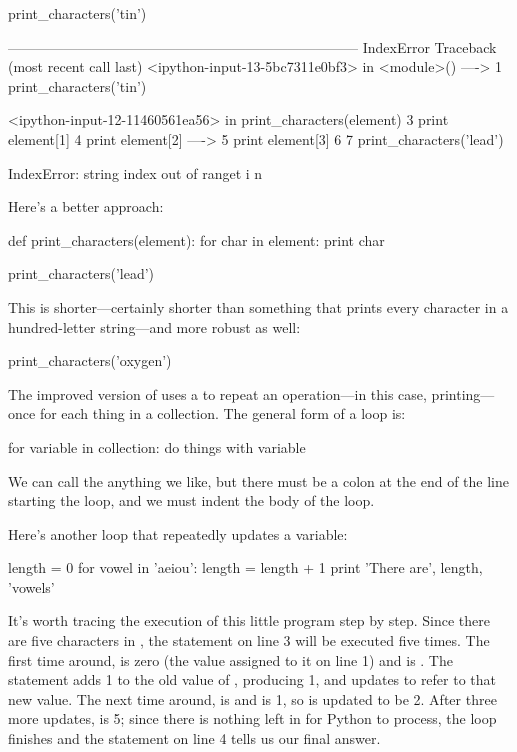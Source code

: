 \begin{VerbIn}
print_characters('tin')
\end{VerbIn}

\begin{VerbErr}
---------------------------------------------------------------------------
IndexError                                Traceback (most recent call last)
<ipython-input-13-5bc7311e0bf3> in <module>()
----> 1 print_characters('tin')

<ipython-input-12-11460561ea56> in print_characters(element)
      3     print element[1]
      4     print element[2]
----> 5     print element[3]
      6
      7 print_characters('lead')

IndexError: string index out of ranget
i
n
\end{VerbErr}

Here's a better approach:

\begin{VerbIn}
def print_characters(element):
    for char in element:
        print char

print_characters('lead')
\end{VerbIn}

This is shorter---certainly shorter than something that prints every
character in a hundred-letter string---and more robust as well:

\begin{VerbIn}
print_characters('oxygen')
\end{VerbIn}

The improved version of  uses a
 to repeat an operation---in this case,
printing---once for each thing in a collection. The general form of a
loop is:

\begin{VerbIn}
for variable in collection:
    do things with variable
\end{VerbIn}

We can call the  anything we
like, but there must be a colon at the end of the line starting the
loop, and we must indent the body of the loop.

Here's another loop that repeatedly updates a variable:

\begin{VerbIn}
length = 0
for vowel in 'aeiou':
    length = length + 1
print 'There are', length, 'vowels'
\end{VerbIn}

It's worth tracing the execution of this little program step by step.
Since there are five characters in , the statement on
line 3 will be executed five times. The first time around,
 is zero (the value assigned to it on line 1) and
 is . The statement adds 1 to the old value of
, producing 1, and updates  to refer to
that new value. The next time around,  is  and
 is 1, so  is updated to be 2. After three
more updates,  is 5; since there is nothing left in
 for Python to process, the loop finishes and the
 statement on line 4 tells us our final answer.

